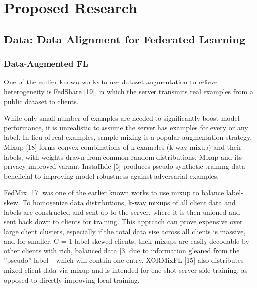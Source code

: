 \documentclass[withindex,glossary,firstyr]{cam-thesis}
\begin{document}
\chapter{Proposed Research} \label{Proposal}

\section{Data: Data Alignment for Federated Learning}


\subsection{Data-Augmented FL}

One of the earlier known works to use dataset augmentation to relieve heterogeneity is FedShare [19], in which the server transmits real examples from a public dataset to clients. 

While only small number of examples are needed to significantly boost model performance, it is unrealistic to assume the server has examples for every or any label. In lieu of real examples, sample mixing is a popular augmentation strategy. Mixup [18] forms convex combinations of k examples (k-way mixup) and their labels, with weights drawn from common random distributions. Mixup and its privacy-improved variant InstaHide [5] produces pseudo-synthetic training data beneficial to improving model-robustness against adversarial examples.

FedMix [17] was one of the earlier known works to use mixup to balance label-skew. To homogenize data distributions, k-way mixups of all client data and labels are constructed and sent up to the server, where it is then unioned and sent back down to clients for training. This approach can prove expensive over large client clusters, especially if the total data size across all clients is massive, and for smaller, C = 1 label-skewed clients, their mixups are easily decodable by other clients with rich, balanced data [3] due to information gleaned from the ”pseudo”-label – which will contain one entry. XORMixFL [15] also distributes mixed-client data via mixup and is intended for one-shot server-side training, as opposed to directly improving local training.
\end{document}
